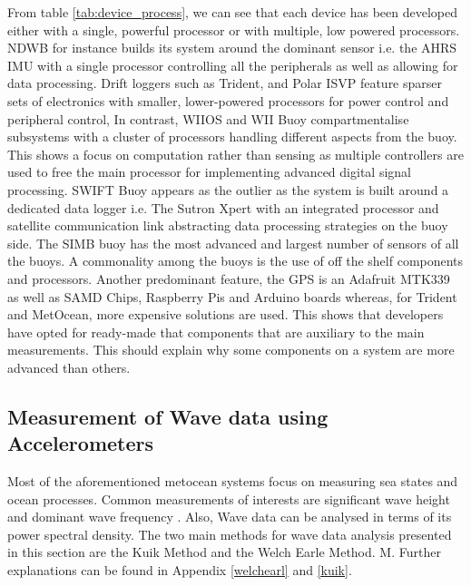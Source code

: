 From table \ref{tab:device_process}, we can see that each device has been developed either with a single, powerful processor or with multiple, low powered processors. NDWB for instance builds its system around the dominant sensor i.e. the AHRS IMU with a single processor controlling all the peripherals as well as allowing for data processing. Drift loggers such as Trident, and Polar ISVP feature sparser sets of electronics with smaller, lower-powered processors for power control and peripheral control, In contrast, WIIOS and WII Buoy compartmentalise subsystems with a cluster of processors handling different aspects from the buoy. This shows a focus on computation rather than sensing as multiple controllers are used to free the main processor for implementing advanced digital signal processing. SWIFT Buoy appears as the outlier as the system is built around a dedicated data logger i.e. The Sutron Xpert with an integrated processor and satellite communication link abstracting data processing strategies on the buoy side. The SIMB buoy has the most advanced and largest number of sensors of all the buoys. A commonality among the buoys is the use of off the shelf components and processors. Another predominant feature, the GPS is an Adafruit MTK339 as well as SAMD Chips, Raspberry Pis and Arduino boards whereas, for Trident and MetOcean, more expensive solutions are used. This shows that developers have opted for ready-made that components that are auxiliary to the main measurements. This should explain why some components on a system are more advanced than others.



\subsection{Measurement of Wave data using Accelerometers}

Most of the aforementioned metocean systems focus on measuring sea states and ocean processes. Common measurements of interests are significant wave height and dominant wave frequency \cite{williams2013wave}. Also, Wave data can be analysed in terms of its power spectral density. The two main methods for wave data analysis presented in this section are the Kuik Method and the Welch Earle Method. M. Further explanations can be found in Appendix \ref{welchearl} and \ref{kuik}.


